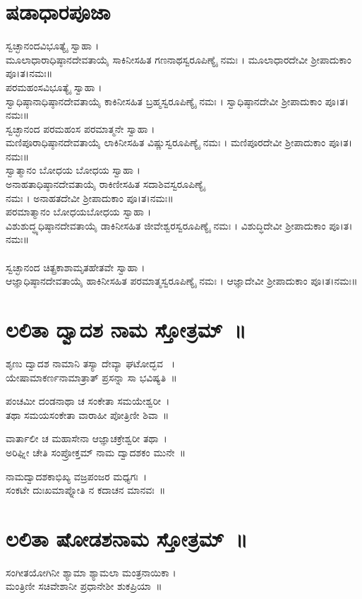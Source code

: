\section{ಷಡಾಧಾರಪೂಜಾ}
 ಸ್ವಚ್ಛಾನಂದವಿಭೂತ್ಯೈ ಸ್ವಾಹಾ ।\\ ಮೂಲಾಧಾರಾಧಿಷ್ಠಾನದೇವತಾಯೈ ಸಾಕಿನೀಸಹಿತ ಗಣನಾಥಸ್ವರೂಪಿಣ್ಯೈ ನಮಃ ।  ಮೂಲಾಧಾರದೇವೀ ಶ್ರೀಪಾದುಕಾಂ ಪೂ।ತ।ನಮಃ॥\\
 ಪರಮಹಂಸವಿಭೂತ್ಯೈ ಸ್ವಾಹಾ ।\\ ಸ್ವಾಧಿಷ್ಠಾನಾಧಿಷ್ಠಾನದೇವತಾಯೈ  ಕಾಕಿನೀಸಹಿತ  ಬ್ರಹ್ಮಸ್ವರೂಪಿಣ್ಯೈ ನಮಃ । ಸ್ವಾಧಿಷ್ಠಾನದೇವೀ ಶ್ರೀಪಾದುಕಾಂ ಪೂ।ತ।ನಮಃ॥\\
ಸ್ವಚ್ಛಾನಂದ ಪರಮಹಂಸ ಪರಮಾತ್ಮನೇ ಸ್ವಾಹಾ ।\\ ಮಣಿಪೂರಾಧಿಷ್ಠಾನದೇವತಾಯೈ ಲಾಕಿನೀಸಹಿತ ವಿಷ್ಣುಸ್ವರೂಪಿಣ್ಯೈ ನಮಃ । ಮಣಿಪೂರದೇವೀ ಶ್ರೀಪಾದುಕಾಂ ಪೂ।ತ।ನಮಃ॥\\
 ಸ್ವಾತ್ಮಾನಂ ಬೋಧಯ ಬೋಧಯ ಸ್ವಾಹಾ ।\\ ಅನಾಹತಾಧಿಷ್ಠಾನದೇವತಾಯೈ ರಾಕಿಣೀಸಹಿತ ಸದಾಶಿವಸ್ವರೂಪಿಣ್ಯೈ\\ ನಮಃ । ಅನಾಹತದೇವೀ ಶ್ರೀಪಾದುಕಾಂ ಪೂ।ತ।ನಮಃ॥\\
ಪರಮಾತ್ಮಾನಂ ಬೋಧಯಬೋಧಯ ಸ್ವಾಹಾ ।\\ ವಿಶುಶುದ್ಧ್ಯಧಿಷ್ಠಾನದೇವತಾಯೈ ಡಾಕಿನೀಸಹಿತ ಜೀವೇಶ್ವರಸ್ವರೂಪಿಣ್ಯೈ ನಮಃ । ವಿಶುದ್ಧಿದೇವೀ ಶ್ರೀಪಾದುಕಾಂ ಪೂ।ತ।ನಮಃ॥\\
\\ ಸ್ವಚ್ಛಾನಂದ ಚಿತ್ಪ್ರಕಾಶಾಮೃತಹೇತವೇ ಸ್ವಾಹಾ ।\\ ಆಜ್ಞಾಧಿಷ್ಠಾನದೇವತಾಯೈ ಹಾಕಿನೀಸಹಿತ ಪರಮಾತ್ಮಸ್ವರೂಪಿಣ್ಯೈ ನಮಃ । ಆಜ್ಞಾದೇವೀ ಶ್ರೀಪಾದುಕಾಂ ಪೂ।ತ।ನಮಃ॥
\newpage
\section{ಲಲಿತಾ ದ್ವಾದಶ ನಾಮ ಸ್ತೋತ್ರಮ್~॥}
ಶೃಣು ದ್ವಾದಶ ನಾಮಾನಿ ತಸ್ಯಾ ದೇವ್ಯಾ ಘಟೋದ್ಭವ ~।\\
ಯೇಷಾಮಾಕರ್ಣನಾಮಾತ್ರಾತ್ ಪ್ರಸನ್ನಾ ಸಾ ಭವಿಷ್ಯತಿ~॥

ಪಂಚಮೀ ದಂಡನಾಥಾ ಚ ಸಂಕೇತಾ ಸಮಯೇಶ್ವರೀ~।\\
ತಥಾ ಸಮಯಸಂಕೇತಾ ವಾರಾಹೀ ಪೋತ್ರಿಣೀ ಶಿವಾ~॥

ವಾರ್ತಾಲೀ ಚ ಮಹಾಸೇನಾ ಆಜ್ಞಾಚಕ್ರೇಶ್ವರೀ ತಥಾ~।\\
ಅರಿಘ್ನೀ ಚೇತಿ ಸಂಪ್ರೋಕ್ತಮ್ ನಾಮ ದ್ವಾದಶಕಂ ಮುನೇ~॥

ನಾಮದ್ವಾದಶಕಾಭಿಖ್ಯ ವಜ್ರಪಂಜರ ಮಧ್ಯಗಃ~।\\
ಸಂಕಟೇ ದುಃಖಮಾಪ್ನೋತಿ ನ ಕದಾಚನ ಮಾನವಃ~॥
\section{ಲಲಿತಾ ಷೋಡಶನಾಮ ಸ್ತೋತ್ರಮ್~॥}
ಸಂಗೀತಯೋಗಿನೀ ಶ್ಯಾಮಾ ಶ್ಯಾಮಲಾ ಮಂತ್ರನಾಯಿಕಾ ।\\
ಮಂತ್ರಿಣೀ ಸಚಿವೇಶಾನೀ ಪ್ರಧಾನೇಶೀ ಶುಕಪ್ರಿಯಾ~॥

